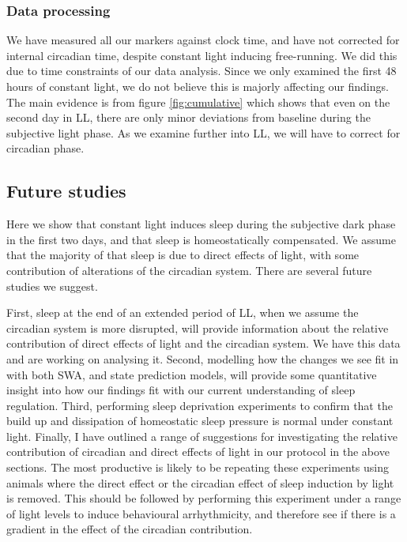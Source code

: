 \subsubsection{Data processing}
We have measured all our markers against clock time, and have not 
corrected for internal circadian time, despite constant light 
inducing free-running.
We did this due to time constraints of our data analysis. 
Since we only examined the first 48 hours of constant light,
we do not believe this is majorly affecting our findings.
The main evidence is from figure \ref{fig:cumulative} which 
shows that even on the second day in LL, there are only
minor deviations from baseline during the subjective light phase. 
As we examine further into LL, we will have to correct for 
circadian phase.

\subsection{Future studies}
Here we show that constant light induces sleep during the 
subjective dark phase in the first two days, and that sleep
is homeostatically compensated.
We assume that the majority of that sleep is due to 
direct effects of light, with some contribution of 
alterations of the circadian system. 
There are several future studies we suggest. 

First, sleep at the end of an extended period of LL, when we assume
the circadian system is more disrupted, will provide information
about the relative contribution of direct effects of light and 
the circadian system. 
We have this data and are working on analysing it. 
Second, modelling how the changes we see fit in with both 
SWA, and state prediction 
models\cite{guillaumin_cortical_2018, rempe_mathematical_2018},
will provide some quantitative insight into how our findings fit 
with our current understanding of sleep regulation. 
Third, performing sleep deprivation experiments to confirm 
that the build up and dissipation of homeostatic sleep pressure 
is normal under constant light.
Finally, I have outlined a range of suggestions for investigating 
the relative contribution of circadian and direct effects of light 
in our protocol in the above sections.
The most productive is likely to be repeating these experiments using 
animals where the direct effect or the circadian effect of sleep
induction by light is removed\cite{rupp_distinct_2019}.
This should be followed by performing this experiment under a range of 
light levels to induce behavioural arrhythmicity, and therefore
see if there is a gradient in the effect of the circadian 
contribution.

